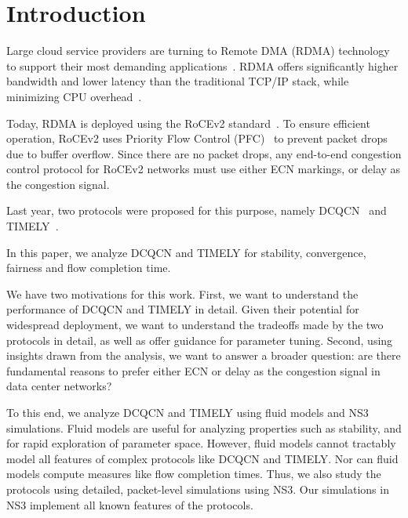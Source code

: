 \section{Introduction}

Large cloud service providers are turning to Remote DMA (RDMA) technology to
support their most demanding applications~\cite{timely,tcp-bolt,dcqcn}.  RDMA
offers significantly higher bandwidth and lower latency than the traditional
TCP/IP stack, while minimizing CPU overhead~\cite{farm,timely,dcqcn}. 

Today, RDMA is deployed using the RoCEv2 standard~\cite{rocev2}. To ensure
efficient operation, RoCEv2 uses Priority Flow Control (PFC)~\cite{pfc} to
prevent packet drops due to buffer overflow.  Since there are no packet drops,
any end-to-end congestion control protocol for RoCEv2 networks must use either
ECN markings, or delay as the congestion signal.  

Last year, two protocols were proposed for this purpose, namely DCQCN~\cite{dcqcn} 
and TIMELY~\cite{timely}. 


In this paper, we analyze DCQCN and TIMELY for stability, convergence,
fairness and flow completion time.

We have two motivations for this work. First, we want to understand the
performance of DCQCN and TIMELY in detail. Given their potential for widespread
deployment, we want to understand the tradeoffs made by the two protocols in
detail, as well as offer guidance for parameter tuning.  Second, using insights
drawn from the analysis, we want to answer a broader question: are there
fundamental reasons to prefer either ECN or delay as the congestion signal in
data center networks? 


To this end, we analyze DCQCN and TIMELY using fluid models and NS3~\cite{NS3}
simulations. Fluid models are useful for analyzing properties such as stability,
and for rapid exploration of parameter space. However, fluid models cannot
tractably model all features of complex protocols like DCQCN and TIMELY. Nor can
fluid models compute measures like flow completion times. Thus, we also study
the protocols using detailed, packet-level simulations using NS3. Our
simulations in NS3 implement all known features of the protocols. 

